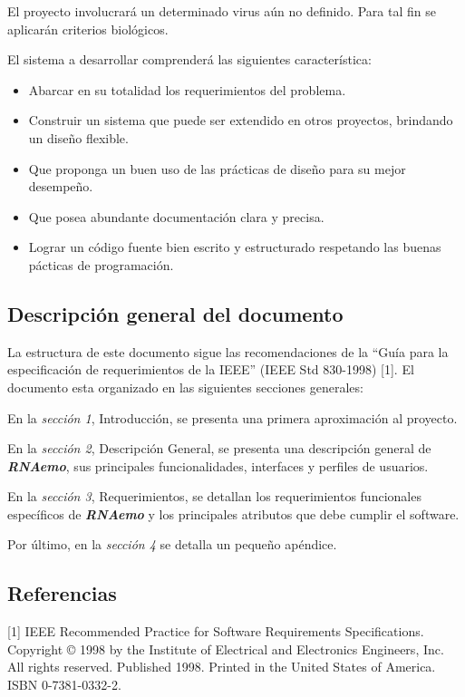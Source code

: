 \documentclass[12pt,a4paper,english,spanish]{article}
\newcommand{\rnaemo}{\textbf{\emph{RNAemo}}}
\begin{document}
\par El proyecto involucrará un determinado virus aún no definido. Para tal fin se aplicarán criterios biológicos.

\par El sistema a desarrollar comprenderá las siguientes característica:
\begin{itemize}
	\item Abarcar en su totalidad los requerimientos del problema.
	\item Construir un sistema que puede ser extendido en otros proyectos, brindando un diseño flexible. 
	\item Que proponga un buen uso de las prácticas de diseño para su mejor desempeño.
	\item Que posea abundante documentación clara y precisa.
	\item Lograr un código fuente bien escrito y estructurado respetando las buenas pácticas de programación.
\end{itemize}

\subsection{Descripción general del documento}
\par La estructura de este documento sigue las recomendaciones de la ``Guía para
la especificación de requerimientos de la IEEE'' (IEEE Std 830-1998) [1].
El documento esta organizado en las siguientes secciones generales: 
\par En la \textit{sección 1}, Introducción, se presenta una primera aproximación al proyecto. 
\par En la \textit{sección 2}, Descripción General, se presenta una descripción general de \rnaemo, sus principales
funcionalidades, interfaces y perfiles de usuarios. 
\par En la \textit{sección 3}, Requerimientos, se detallan los requerimientos funcionales específicos de \textbf{\emph{RNAemo}} y
 los principales atributos que debe cumplir el software.
\par Por último, en la \textit{sección 4} se detalla un pequeño apéndice.

\subsection{Referencias}
[1] IEEE Recommended Practice for Software Requirements Specifications. Copyright © 1998 by the Institute of Electrical and Electronics Engineers, Inc. All rights reserved. Published 1998. Printed in the United States of America. ISBN 0-7381-0332-2. \\
\end{document}
